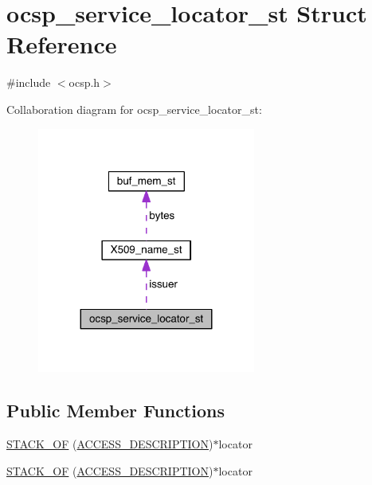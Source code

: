 \hypertarget{structocsp__service__locator__st}{}\section{ocsp\+\_\+service\+\_\+locator\+\_\+st Struct Reference}
\label{structocsp__service__locator__st}


{\ttfamily \#include $<$ocsp.\+h$>$}



Collaboration diagram for ocsp\+\_\+service\+\_\+locator\+\_\+st\+:\nopagebreak
\begin{figure}[H]
\begin{center}
\leavevmode
\includegraphics[width=203pt]{structocsp__service__locator__st__coll__graph}
\end{center}
\end{figure}
\subsection*{Public Member Functions}
\begin{DoxyCompactItemize}
\item 
\hyperlink{structocsp__service__locator__st_ac391fc79368742f25ff4acb590c1ecb3}{S\+T\+A\+C\+K\+\_\+\+OF} (\hyperlink{crypto_2x509v3_2x509v3_8h_a200fc9025d040a011250049a94c4bac4}{A\+C\+C\+E\+S\+S\+\_\+\+D\+E\+S\+C\+R\+I\+P\+T\+I\+ON})$\ast$locator
\item 
\hyperlink{structocsp__service__locator__st_ac391fc79368742f25ff4acb590c1ecb3}{S\+T\+A\+C\+K\+\_\+\+OF} (\hyperlink{crypto_2x509v3_2x509v3_8h_a200fc9025d040a011250049a94c4bac4}{A\+C\+C\+E\+S\+S\+\_\+\+D\+E\+S\+C\+R\+I\+P\+T\+I\+ON})$\ast$locator
\end{DoxyCompactItemize}
